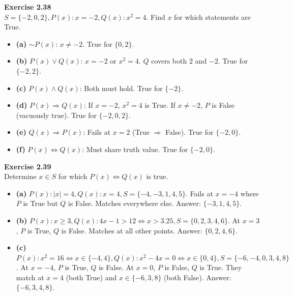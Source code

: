 \documentclass[11pt]{article}
\begin{document}
\vspace{10pt}
\textbf{Exercise 2.38} \\
$S=\{-2,0,2\}, P(x): x=-2, Q(x): x^2=4$. Find $x$ for which statements are True.
\begin{itemize}
    \item \textbf{(a)} $\sim P(x)$: $x \neq -2$. True for \textbf{$\{0, 2\}$}.
    \item \textbf{(b)} $P(x) \vee Q(x)$: $x=-2$ or $x^2=4$. $Q$ covers both $2$ and $-2$. True for \textbf{$\{-2, 2\}$}.
    \item \textbf{(c)} $P(x) \wedge Q(x)$: Both must hold. True for \textbf{$\{-2\}$}.
    \item \textbf{(d)} $P(x) \Rightarrow Q(x)$: If $x=-2$, $x^2=4$ is True. If $x \neq -2$, $P$ is False (vacuously true). True for \textbf{$\{-2, 0, 2\}$}.
    \item \textbf{(e)} $Q(x) \Rightarrow P(x)$: Fails at $x=2$ (True $\Rightarrow$ False). True for \textbf{$\{-2, 0\}$}.
    \item \textbf{(f)} $P(x) \Leftrightarrow Q(x)$: Must share truth value. True for \textbf{$\{-2, 0\}$}.
\end{itemize}

\vspace{10pt}
\textbf{Exercise 2.39} \\
Determine $x \in S$ for which $P(x) \Leftrightarrow Q(x)$ is true.
\begin{itemize}
    \item \textbf{(a)} $P(x): |x|=4, Q(x): x=4, S=\{-4,-3,1,4,5\}$.
    Fails at $x=-4$ where $P$ is True but $Q$ is False. Matches everywhere else. Answer: \textbf{$\{-3, 1, 4, 5\}$}.
    \item \textbf{(b)} $P(x): x \geq 3, Q(x): 4x-1 > 12 \Leftrightarrow x > 3.25, S=\{0,2,3,4,6\}$.
    At $x=3$, $P$ is True, $Q$ is False. Matches at all other points. Answer: \textbf{$\{0, 2, 4, 6\}$}.
    \item \textbf{(c)} $P(x): x^2=16 \Leftrightarrow x \in \{-4,4\}, Q(x): x^2-4x=0 \Leftrightarrow x \in \{0,4\}, S=\{-6,-4,0,3,4,8\}$.
    At $x=-4$, $P$ is True, $Q$ is False. At $x=0$, $P$ is False, $Q$ is True. They match at $x=4$ (both True) and $x \in \{-6,3,8\}$ (both False). Answer: \textbf{$\{-6, 3, 4, 8\}$}.
\end{itemize}
\end{document}
